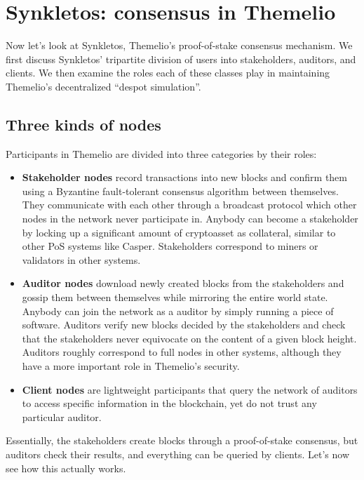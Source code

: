 \documentclass[letterpaper,12pt,oneside]{article}
\begin{document}
\section{Synkletos: consensus in Themelio}

Now let's look at Synkletos, Themelio's proof-of-stake consensus mechanism. We first discuss Synkletos' tripartite division of users into stakeholders, auditors, and clients. We then examine the roles each of these classes play in maintaining Themelio's decentralized ``despot simulation''.

\subsection{Three kinds of nodes}

Participants in Themelio are divided into three categories by their roles:

\begin{itemize}
    \item \textbf{Stakeholder nodes} record transactions into new blocks and confirm them using a Byzantine fault-tolerant consensus algorithm between themselves. They communicate with each other through a broadcast protocol which other nodes in the network never participate in. Anybody can become a stakeholder by locking up a significant amount of cryptoasset as collateral, similar to other PoS systems like Casper. Stakeholders correspond to miners or validators in other systems.
    \item \textbf{Auditor nodes} download newly created blocks from the stakeholders and gossip them between themselves while mirroring the entire world state. Anybody can join the network as a auditor by simply running a piece of software. Auditors verify new blocks decided by the stakeholders and check that the stakeholders never equivocate on the content of a given block height. Auditors roughly correspond to full nodes in other systems, although they have a more important role in Themelio's security.
    \item \textbf{Client nodes} are lightweight participants that query the network of auditors to access specific information in the blockchain, yet do not trust any particular auditor.
\end{itemize}

Essentially, the stakeholders create blocks through a proof-of-stake consensus, but auditors check their results, and everything can be queried by clients. Let's now see how this actually works.
\end{document}

